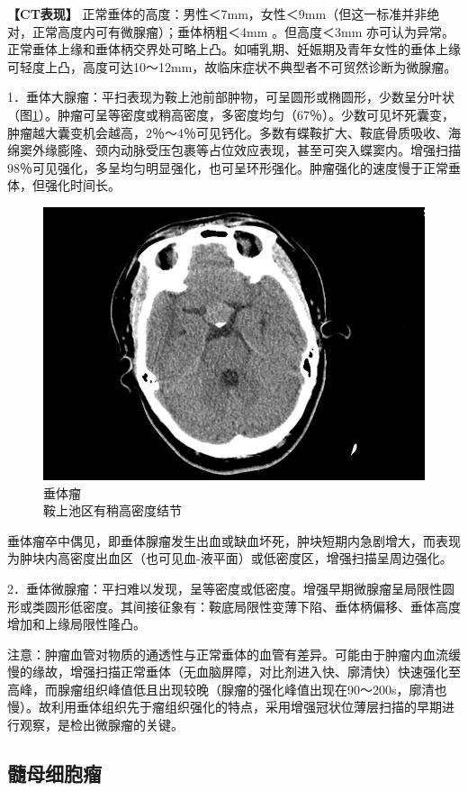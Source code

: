 \textbf{【CT表现】}
正常垂体的高度：男性＜7mm，女性＜9mm（但这一标准并非绝对，正常高度内可有微腺瘤）；垂体柄粗＜4mm
。但高度＜3mm
亦可认为异常。正常垂体上缘和垂体柄交界处可略上凸。如哺乳期、妊娠期及青年女性的垂体上缘可轻度上凸，高度可达10～12mm，故临床症状不典型者不可贸然诊断为微腺瘤。

1．垂体大腺瘤：平扫表现为鞍上池前部肿物，可呈圆形或椭圆形，少数呈分叶状（图\ref{fig2-47}）。肿瘤可呈等密度或稍高密度，多密度均匀（67％）。少数可见坏死囊变，肿瘤越大囊变机会越高，2％～4％可见钙化。多数有蝶鞍扩大、鞍底骨质吸收、海绵窦外缘膨隆、颈内动脉受压包裹等占位效应表现，甚至可突入蝶窦内。增强扫描98％可见强化，多呈均匀明显强化，也可呈环形强化。肿瘤强化的速度慢于正常垂体，但强化时间长。

\begin{figure}[!htbp]
 \centering
 \includegraphics[width=.7\textwidth,height=\textheight,keepaspectratio]{./images/Image00077.jpg}
 \captionsetup{justification=centering}
 \caption{垂体瘤\\{\small 鞍上池区有稍高密度结节}}
 \label{fig2-47}
  \end{figure} 

垂体瘤卒中偶见，即垂体腺瘤发生出血或缺血坏死，肿块短期内急剧增大，而表现为肿块内高密度出血区（也可见血-液平面）或低密度区，增强扫描呈周边强化。

2．垂体微腺瘤：平扫难以发现，呈等密度或低密度。增强早期微腺瘤呈局限性圆形或类圆形低密度。其间接征象有：鞍底局限性变薄下陷、垂体柄偏移、垂体高度增加和上缘局限性隆凸。

注意：肿瘤血管对物质的通透性与正常垂体的血管有差异。可能由于肿瘤内血流缓慢的缘故，增强扫描正常垂体（无血脑屏障，对比剂进入快、廓清快）快速强化至高峰，而腺瘤组织峰值低且出现较晚（腺瘤的强化峰值出现在90～200s，廓清也慢）。故利用垂体组织先于瘤组织强化的特点，采用增强冠状位薄层扫描的早期进行观察，是检出微腺瘤的关键。

\subsection{髓母细胞瘤}

